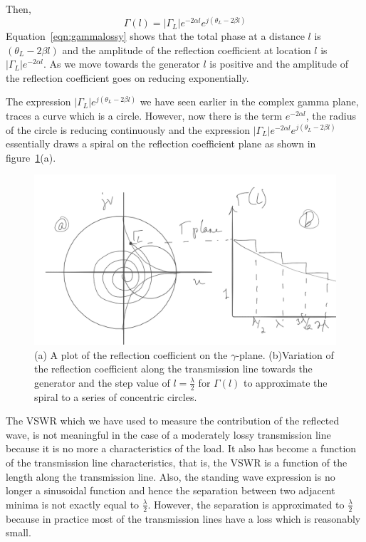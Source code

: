 Then,
\begin{dmath}
\Gamma{(l)} = |\Gamma_L|e^{-2\alpha l}e^{j(\theta_L-2\beta l)}
\label{eqn:gammalossy}
\end{dmath}
Equation~\eqref{eqn:gammalossy} shows that the total phase at a distance $l$ is $(\theta_L - 2\beta l)$ and the amplitude of the reflection coefficient at location $l$ is $|\Gamma_L|e^{-2\alpha l}$. As we move towards the generator $l$ is positive and the amplitude of the reflection coefficient goes on reducing exponentially.

The expression $|\Gamma_L|e^{j(\theta_L-2\beta l)}$ we have seen earlier in the complex gamma plane, traces a curve which is a circle. However, now there is the term $e^{-2\alpha l}$, the radius of the circle is reducing continuously and the expression $|\Gamma_L|e^{-2\alpha l}e^{j(\theta_L - 2\beta l)}$ essentially draws a spiral on the reflection coefficient plane as shown in figure~\ref{fig:lossygamma}(a).
\begin{figure}[h]
\centering
\includegraphics[width=1\linewidth]{"./graphics/lossy_gamma_temp"}
\caption{(a) A plot of the reflection coefficient on the $\gamma$-plane. (b)Variation of the reflection coefficient along the transmission line towards the generator and the step value of $l = \frac{\lambda}{2}$ for $\Gamma(l)$ to approximate the spiral to a series of concentric circles.}
\label{fig:lossygamma}
\end{figure}

The VSWR which we have used to measure the contribution of the reflected wave, is not meaningful in the case of a moderately lossy transmission line because it is no more a characteristics of the load. It also has become a function of the transmission line characteristics, that is, the VSWR is a function of the length along the transmission line. Also, the standing wave expression is no longer a sinusoidal function and hence the separation between two adjacent minima is not exactly equal to $\frac{\lambda}{2}$. However, the separation is approximated to $\frac{\lambda}{2}$ because in practice most of the transmission lines have a loss which is reasonably small.

